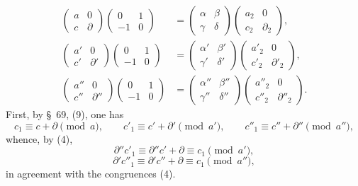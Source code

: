 \documentclass[11pt]{article}
\begin{document}
\begin{equation}
\begin{aligned}
\begin{pmatrix}a&0\\ c&\partial\end{pmatrix}
\begin{pmatrix}0&1\\ -1&0\end{pmatrix}
&=
\begin{pmatrix}\alpha&\beta\\ \gamma&\delta\end{pmatrix}
\begin{pmatrix}a_2&0\\ c_2&\partial_2\end{pmatrix},\\
\begin{pmatrix}a'&0\\ c'&\partial'\end{pmatrix}
\begin{pmatrix}0&1\\ -1&0\end{pmatrix}
&=
\begin{pmatrix}\alpha'&\beta'\\ \gamma'&\delta'\end{pmatrix}
\begin{pmatrix}a'_2&0\\ c'_2&\partial'_2\end{pmatrix},\\
\begin{pmatrix}a''&0\\ c''&\partial''\end{pmatrix}
\begin{pmatrix}0&1\\ -1&0\end{pmatrix}
&=
\begin{pmatrix}\alpha''&\beta''\\ \gamma''&\delta''\end{pmatrix}
\begin{pmatrix}a''_2&0\\ c''_2&\partial''_2\end{pmatrix}.
\end{aligned}
\tag{6}
\end{equation}
First, by \S~69, (9), one has
\[
 c_1\equiv c+\partial\pmod a,
 \qquad c'_1\equiv c'+\partial'\pmod {a'},
 \qquad c''_1\equiv c''+\partial''\pmod {a''},
\]
whence, by (4),
\[
 \partial''c'_1\equiv \partial''c'+\partial\equiv c_1\pmod {a'},
\]
\[
 \partial'c''_1\equiv \partial'c''+\partial\equiv c_1\pmod {a''},
\]
in agreement with the congruences (4).
\end{document}
